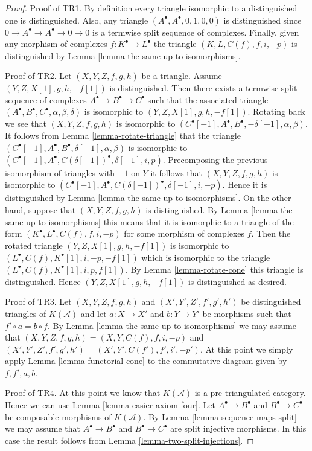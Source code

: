 \begin{proof}
Proof of TR1. By definition every triangle isomorphic to a distinguished
one is distinguished. Also, any triangle $(A^\bullet, A^\bullet, 0, 1, 0, 0)$
is distinguished since $0 \to A^\bullet \to A^\bullet \to 0 \to 0$ is
a termwise split sequence of complexes. Finally, given any morphism of
complexes $f : K^\bullet \to L^\bullet$ the triangle
$(K, L, C(f), f, i, -p)$ is distinguished by
Lemma \ref{lemma-the-same-up-to-isomorphisms}.

\medskip\noindent
Proof of TR2. Let $(X, Y, Z, f, g, h)$ be a triangle.
Assume $(Y, Z, X[1], g, h, -f[1])$ is distinguished.
Then there exists a termwise split sequence of complexes
$A^\bullet \to B^\bullet \to C^\bullet$ such that the associated
triangle $(A^\bullet, B^\bullet, C^\bullet, \alpha, \beta, \delta)$
is isomorphic to $(Y, Z, X[1], g, h, -f[1])$. Rotating back we see
that $(X, Y, Z, f, g, h)$ is isomorphic to
$(C^\bullet[-1], A^\bullet, B^\bullet, -\delta[-1], \alpha, \beta)$.
It follows from Lemma \ref{lemma-rotate-triangle} that the triangle
$(C^\bullet[-1], A^\bullet, B^\bullet, \delta[-1], \alpha, \beta)$
is isomorphic to
$(C^\bullet[-1], A^\bullet, C(\delta[-1])^\bullet, \delta[-1], i, p)$.
Precomposing the previous isomorphism of triangles with $-1$ on $Y$
it follows that $(X, Y, Z, f, g, h)$ is isomorphic to
$(C^\bullet[-1], A^\bullet, C(\delta[-1])^\bullet, \delta[-1], i, -p)$.
Hence it is distinguished by
Lemma \ref{lemma-the-same-up-to-isomorphisms}.
On the other hand, suppose that $(X, Y, Z, f, g, h)$ is distinguished.
By Lemma \ref{lemma-the-same-up-to-isomorphisms} this means that it is
isomorphic to a triangle of the form
$(K^\bullet, L^\bullet, C(f), f, i, -p)$ for some morphism of
complexes $f$. Then the rotated triangle $(Y, Z, X[1], g, h, -f[1])$ is
isomorphic to $(L^\bullet, C(f), K^\bullet[1], i, -p, -f[1])$ which is
isomorphic to the triangle $(L^\bullet, C(f), K^\bullet[1], i, p, f[1])$.
By Lemma \ref{lemma-rotate-cone} this triangle is distinguished.
Hence $(Y, Z, X[1], g, h, -f[1])$ is distinguished as desired.

\medskip\noindent
Proof of TR3. Let
$(X, Y, Z, f, g, h)$ and $(X', Y', Z', f', g', h')$
be distinguished triangles of $K(\mathcal{A})$
and let $a : X \to X'$ and $b : Y \to Y'$ be morphisms
such that $f' \circ a = b \circ f$. By
Lemma \ref{lemma-the-same-up-to-isomorphisms} we may assume that
$(X, Y, Z, f, g, h) = (X, Y, C(f), f, i, -p)$ and
$(X', Y', Z', f', g', h') = (X', Y', C(f'), f', i', -p')$.
At this point we simply apply Lemma \ref{lemma-functorial-cone}
to the commutative diagram given by $f, f', a, b$.

\medskip\noindent
Proof of TR4. At this point we know that $K(\mathcal{A})$
is a pre-triangulated category. Hence we can use
Lemma \ref{lemma-easier-axiom-four}. Let $A^\bullet \to B^\bullet$
and $B^\bullet \to C^\bullet$ be composable morphisms of
$K(\mathcal{A})$. By Lemma \ref{lemma-sequence-maps-split} we may assume that
$A^\bullet \to B^\bullet$ and $B^\bullet \to C^\bullet$
are split injective morphisms. In this case the result follows
from Lemma \ref{lemma-two-split-injections}.
\end{proof}

